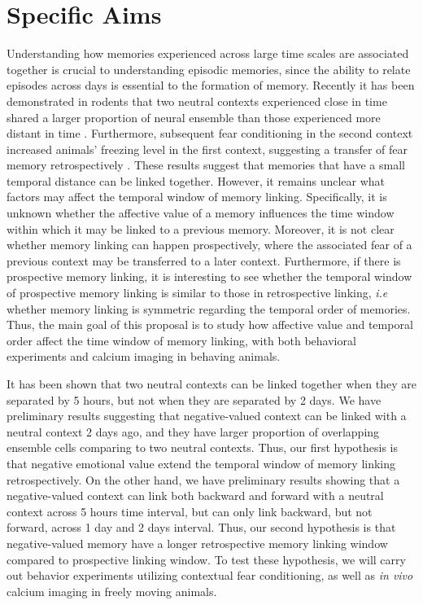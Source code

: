 \documentclass[master.tex]{subfiles}
\begin{document}
\section*{Specific Aims}

Understanding how memories experienced across large time scales are associated
together is crucial to understanding episodic memories, since the ability to
relate episodes across days is essential to the formation of memory. Recently it
has been demonstrated in rodents that two neutral contexts experienced close in
time shared a larger proportion of neural ensemble than those experienced more
distant in time . Furthermore, subsequent fear conditioning in the second
context increased animals' freezing level in the first context, suggesting a
transfer of fear memory retrospectively \cite{cai_shared_2016}. These results
suggest that memories that have a small temporal distance can be linked
together. However, it remains unclear what factors may affect the temporal
window of memory linking. Specifically, it is unknown whether the affective
value of a memory influences the time window within which it may be linked to a
previous memory. Moreover, it is not clear whether memory linking can happen
prospectively, where the associated fear of a previous context may be
transferred to a later context. Furthermore, if there is prospective memory
linking, it is interesting to see whether the temporal window of prospective
memory linking is similar to those in retrospective linking, \textit{i.e}
whether memory linking is symmetric regarding the temporal order of memories.
Thus, the main goal of this proposal is to study how affective value and
temporal order affect the time window of memory linking, with both behavioral
experiments and calcium imaging in behaving animals.

It has been shown that two neutral contexts can be linked together when they are
separated by 5 hours, but not when they are separated by 2 days. We have
preliminary results suggesting that negative-valued context can be linked with a
neutral context 2 days ago, and they have larger proportion of overlapping
ensemble cells comparing to two neutral contexts. Thus, our first hypothesis is
that negative emotional value extend the temporal window of memory linking
retrospectively. On the other hand, we have preliminary results showing that a
negative-valued context can link both backward and forward with a neutral
context across 5 hours time interval, but can only link backward, but not
forward, across 1 day and 2 days interval. Thus, our second hypothesis is that
negative-valued memory have a longer retrospective memory linking window
compared to prospective linking window. To test these hypothesis, we will carry
out behavior experiments utilizing contextual fear conditioning, as well as
\textit{in vivo} calcium imaging in freely moving animals.
\end{document}
